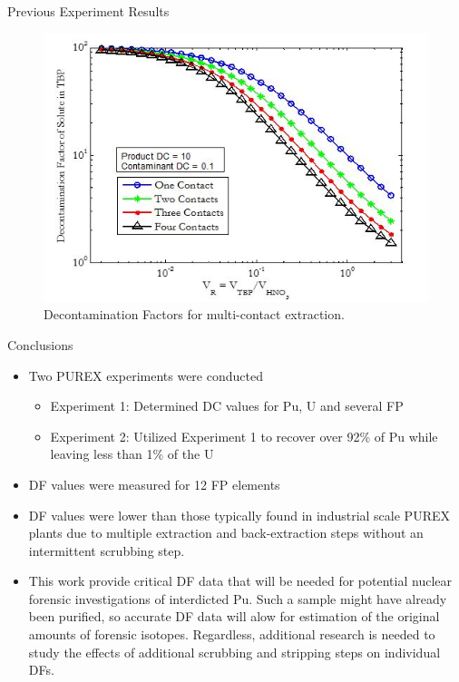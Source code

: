 \documentclass{beamer}
\begin{document}
\begin{frame}{Previous Experiment Results}
  \begin{figure}[H]
    \vspace*{-.1cm}
    \begin{center}
      \includegraphics[scale = 0.6]{df}
      \vspace{-0.5cm}
      \caption{\tiny{Decontamination Factors for multi-contact extraction.}}
    \end{center}
  \end{figure}
\end{frame}

\begin{frame}{Conclusions}
  \begin{itemize}
  \item{Two PUREX experiments were conducted}
    \begin{itemize}
    \item{Experiment 1: Determined DC values for Pu, U and several FP}
    \item{Experiment 2: Utilized Experiment 1 to recover over 92\%
      of Pu while leaving less than 1\% of the U}
    \end{itemize}
  \item{DF values were measured for 12 FP elements}
  \item{DF values were lower than those typically found in industrial
    scale PUREX plants due to multiple extraction and back-extraction
    steps without an intermittent scrubbing step.}
  \item{This work provide critical DF data that will be needed for
    potential nuclear forensic investigations of interdicted Pu.
    Such a sample might have already been purified, so accurate
    DF data will alow for estimation of the original amounts of forensic
    isotopes. Regardless, additional research is needed to study the
    effects of additional scrubbing and stripping steps on individual DFs.}
  \end{itemize}
\end{frame}
\end{document}
